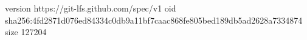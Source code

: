 version https://git-lfs.github.com/spec/v1
oid sha256:4fd2871d076ed84334c0db9a11bf7caac868fe805bed189db5ad2628a7334874
size 127204
